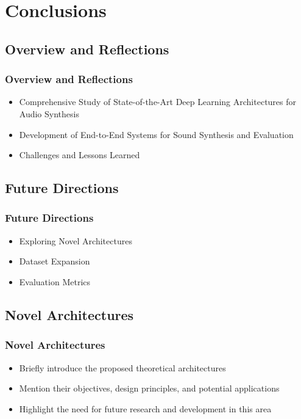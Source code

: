 \section{Conclusions}

\subsection{Overview and Reflections}

\begin{frame}
    \frametitle{Overview and Reflections}
    \begin{itemize}
        \item Comprehensive Study of State-of-the-Art Deep Learning Architectures for Audio Synthesis
        \item Development of End-to-End Systems for Sound Synthesis and Evaluation
        \item Challenges and Lessons Learned
    \end{itemize}
\end{frame}

\subsection{Future Directions}

\begin{frame}
    \frametitle{Future Directions}
    \begin{itemize}
        \item Exploring Novel Architectures
        \item Dataset Expansion
        \item Evaluation Metrics
    \end{itemize}
\end{frame}

\subsection{Novel Architectures}


\begin{frame}
    \frametitle{Novel Architectures}
    \begin{itemize}
        \item Briefly introduce the proposed theoretical architectures
        \item Mention their objectives, design principles, and potential applications
        \item Highlight the need for future research and development in this area
    \end{itemize}
\end{frame}

